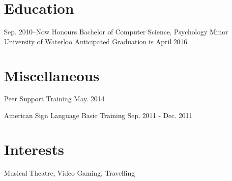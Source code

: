 \documentclass[]{friggeri-cv} %
\begin{document}
\section{Education}

\begin{entrylist}
	
	\entry
	{Sep. 2010--Now}
	{Honours Bachelor of Computer Science, Psychology Minor}
	{University of Waterloo}
	{Anticipated Graduation is April 2016}
\end{entrylist}

\section{Miscellaneous}

\begin{entrylist}
\short
{Peer Support Training}
{May. 2014}

\short
{American Sign Language Basic Training}
{Sep. 2011 - Dec. 2011}
\end{entrylist}


\section{Interests}
Musical Theatre, Video Gaming, Travelling
\end{document}
